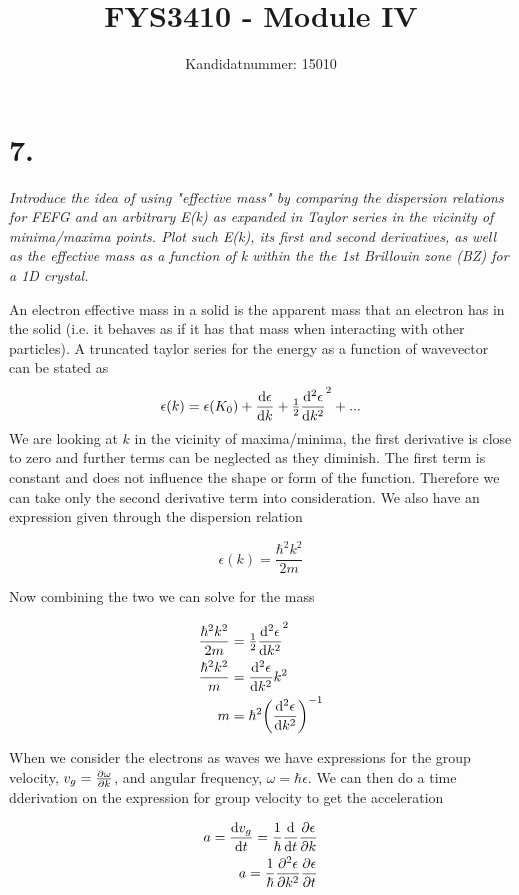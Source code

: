 \documentclass{article}
\author{Kandidatnummer: 15010}
\title{FYS3410 - Module IV}
\begin{document}
\maketitle

\section*{7. }

\emph{Introduce the idea of using "effective mass" by comparing the dispersion relations for FEFG and an
arbitrary E(k) as expanded in Taylor series in the vicinity of minima/maxima points. Plot such E(k),
its first and second derivatives, as well as the effective mass as a function of k within the the 1st
Brillouin zone (BZ) for a 1D crystal.}

An electron effective mass in a solid is the apparent mass that an electron has in the solid (i.e. it behaves as if it has that mass when interacting with other particles).
A truncated taylor series for the energy as a function of wavevector can be stated as
$$ \epsilon(k) = \epsilon(K_0) + \dv{\epsilon}{k} (k-k_0) + \tfrac{1}{2}\dv[2]{\epsilon}{k} (k-k_0)^2 + ...$$
We are looking at $k$ in the vicinity of maxima/minima, the first derivative is close to zero and further terms can be neglected as they diminish.
The first term is constant and does not influence the shape or form of the function.
Therefore we can take only the second derivative term into consideration.
We also have an expression given through the dispersion relation

$$ \epsilon(k) = \frac{\hbar^2k^2}{2m} $$

Now combining the two we can solve for the mass

\begin{align*}
	\frac{\hbar^2k^2}{2m} &= \tfrac{1}{2}\dv[2]{\epsilon}{k} (k-k_0)^2\\
	\frac{\hbar^2k^2}{m} &= \dv[2]{\epsilon}{k}k^2\\
	m &= \hbar^2\qty(\dv[2]{\epsilon}{k})^{-1}
\end{align*}

When we consider the electrons as waves we have expressions for the group velocity, $v_g = \pdv{\omega}{k}$, and angular frequency, $\omega = \hbar \epsilon$. We can then do a time dderivation on the expression for group velocity to get the acceleration

\begin{align*}
	a = \dv{v_g}{t} = \frac{1}{\hbar}\dv{}{t}\pdv{\epsilon}{k}\\
	a = \frac{1}{\hbar}\pdv[2]{\epsilon}{k}\pdv{\epsilon}{t}
\end{align*}
\end{document}
